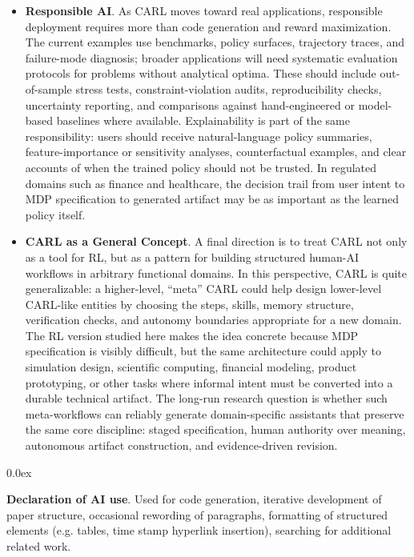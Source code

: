 \documentclass[mnsc,sglanonrev]{informs4}
\begin{document}
\begin{itemize}
\item \textbf{Responsible AI}. As CARL moves toward real applications, responsible deployment requires more than code generation and reward maximization. The current examples use benchmarks, policy surfaces, trajectory traces, and failure-mode diagnosis; broader applications will need systematic evaluation protocols for problems without analytical optima. These should include out-of-sample stress tests, constraint-violation audits, reproducibility checks, uncertainty reporting, and comparisons against hand-engineered or model-based baselines where available. Explainability is part of the same responsibility: users should receive natural-language policy summaries, feature-importance or sensitivity analyses, counterfactual examples, and clear accounts of when the trained policy should not be trusted. In regulated domains such as finance and healthcare, the decision trail from user intent to MDP specification to generated artifact may be as important as the learned policy itself.
\item \textbf{CARL as a General Concept}. A final direction is to treat CARL not only as a tool for RL, but as a pattern for building structured human-AI workflows in arbitrary functional domains. In this perspective, CARL is quite generalizable: a higher-level, ``meta'' CARL could help design lower-level CARL-like entities by choosing the steps, skills, memory structure, verification checks, and autonomy boundaries appropriate for a new domain. The RL version studied here makes the idea concrete because MDP specification is visibly difficult, but the same architecture could apply to simulation design, scientific computing, financial modeling, product prototyping, or other tasks where informal intent must be converted into a durable technical artifact. The long-run research question is whether such meta-workflows can reliably generate domain-specific assistants that preserve the same core discipline: staged specification, human authority over meaning, autonomous artifact construction, and evidence-driven revision.
\end{itemize}

\begingroup \parindent 0pt \parskip 0.0ex \def\enotesize{\normalsize} \theendnotes \endgroup

\textbf{Declaration of AI use}. Used for code generation, iterative development of paper structure, occasional rewording of paragraphs, formatting of structured elements (e.g. tables, time stamp hyperlink insertion), searching for additional related work.
\end{document}
